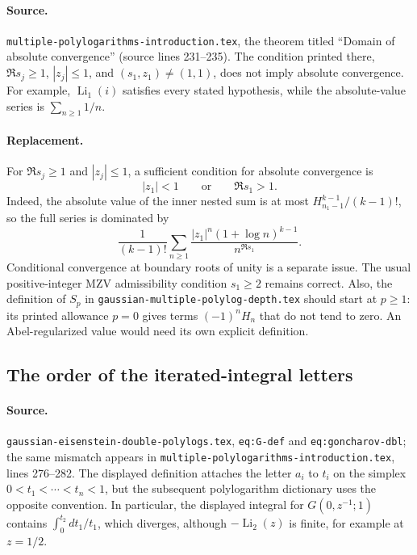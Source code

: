 \documentclass[11pt,a4paper]{article}
\DeclareMathOperator{\Li}{Li}
\theoremstyle{definition}
\theoremstyle{remark}
\numberwithin{equation}{section}
\begin{document}
\paragraph{Source.}
\texttt{multiple-polylogarithms-introduction.tex}, the theorem titled
``Domain of absolute convergence'' (source lines 231--235).
The condition printed there, $\Re s_j\geq1$, $|z_j|\leq1$, and
$(s_1,z_1)\neq(1,1)$, does not imply absolute convergence.
For example, $\Li_1(i)$ satisfies every stated hypothesis, while the
absolute-value series is $\sum_{n\geq1}1/n$.

\paragraph{Replacement.}
For $\Re s_j\geq1$ and $|z_j|\leq1$, a sufficient condition for
absolute convergence is
\[
 |z_1|<1\qquad\text{or}\qquad\Re s_1>1.
\]
Indeed, the absolute value of the inner nested sum is at most
$H_{n_1-1}^{k-1}/(k-1)!$, so the full series is dominated by
\[
 \frac1{(k-1)!}\sum_{n\geq1}
    \frac{|z_1|^n(1+\log n)^{k-1}}{n^{\Re s_1}}.
\]
Conditional convergence at boundary roots of unity is a separate issue.
The usual positive-integer MZV admissibility condition $s_1\geq2$ remains
correct. Also, the definition of $S_p$ in
\texttt{gaussian-multiple-polylog-depth.tex} should start at $p\geq1$:
its printed allowance $p=0$ gives terms $(-1)^nH_n$ that do not tend to
zero. An Abel-regularized value would need its own explicit definition.

\subsection{The order of the iterated-integral letters}
\label{audit:poly:integral-order}

\paragraph{Source.}
\texttt{gaussian-eisenstein-double-polylogs.tex},
\texttt{eq:G-def} and \texttt{eq:goncharov-dbl}; the same mismatch appears
in \texttt{multiple-polylogarithms-introduction.tex}, lines 276--282.
The displayed definition attaches the letter $a_i$ to $t_i$ on the simplex
$0<t_1<\cdots<t_n<1$, but the subsequent polylogarithm dictionary uses the
opposite convention. In particular, the displayed integral for
$G(0,z^{-1};1)$ contains $\int_0^{t_2}dt_1/t_1$, which diverges, although
$-\Li_2(z)$ is finite, for example at $z=1/2$.
\end{document}
